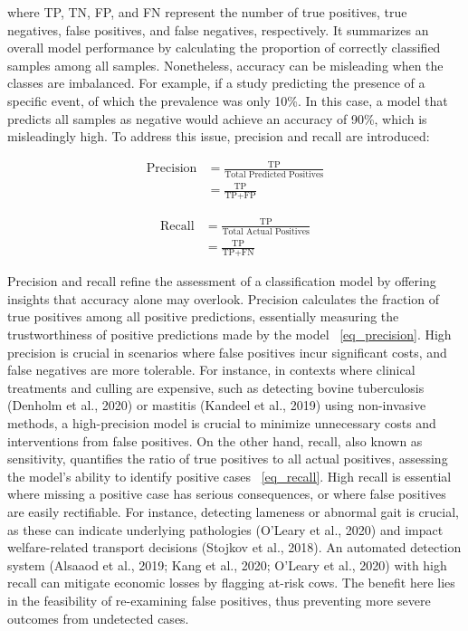 where TP, TN, FP, and FN represent the number of true positives, true negatives, false positives, and false negatives, respectively. It summarizes an overall model performance by calculating the proportion of correctly classified samples among all samples. Nonetheless, accuracy can be misleading when the classes are imbalanced. For example, if a study predicting the presence of a specific event, of which the prevalence was only 10\%. In this case, a model that predicts all samples as negative would achieve an accuracy of 90\%, which is misleadingly high. To address this issue, precision and recall are introduced:

\begin{equation} \label{eq_precision}
    \begin{split}
    \text{Precision} &= \frac{\text{TP}}{\text{Total Predicted Positives}}\\
                    &=\frac{\text{TP}}{\text{TP} + \text{FP}}
    \end{split}
\end{equation}

\begin{equation} \label{eq_recall}
    \begin{split}
    \text{Recall} &= \frac{\text{TP}}{\text{Total Actual Positives}}\\
                &=\frac{\text{TP}}{\text{TP} + \text{FN}}
    \end{split}
\end{equation}

Precision and recall refine the assessment of a classification model by offering insights that accuracy alone may overlook. Precision calculates the fraction of true positives among all positive predictions, essentially measuring the trustworthiness of positive predictions made by the model ~\ref{eq_precision}. High precision is crucial in scenarios where false positives incur significant costs, and false negatives are more tolerable. For instance, in contexts where clinical treatments and culling are expensive, such as detecting bovine tuberculosis (Denholm et al., 2020) or mastitis (Kandeel et al., 2019) using non-invasive methods, a high-precision model is crucial to minimize unnecessary costs and interventions from false positives. On the other hand, recall, also known as sensitivity, quantifies the ratio of true positives to all actual positives, assessing the model's ability to identify positive cases ~\ref{eq_recall}. High recall is essential where missing a positive case has serious consequences, or where false positives are easily rectifiable. For instance, detecting lameness or abnormal gait is crucial, as these can indicate underlying pathologies (O’Leary et al., 2020) and impact welfare-related transport decisions (Stojkov et al., 2018). An automated detection system (Alsaaod et al., 2019; Kang et al., 2020; O’Leary et al., 2020) with high recall can mitigate economic losses by flagging at-risk cows. The benefit here lies in the feasibility of re-examining false positives, thus preventing more severe outcomes from undetected cases.


